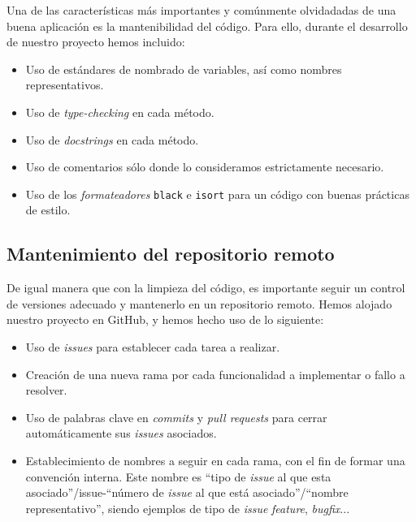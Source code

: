 \documentclass[11pt,a4paper]{article}
\begin{document}
Una de las características más importantes y comúnmente olvidadadas de una buena aplicación es la mantenibilidad del código. Para ello, durante el desarrollo de nuestro proyecto hemos incluido:

\begin{itemize}
    \item Uso de estándares de nombrado de variables, así como nombres representativos.
    \item Uso de \textit{type-checking} en cada método.
    \item Uso de \textit{docstrings} en cada método.
    \item Uso de comentarios sólo donde lo consideramos estrictamente necesario.
    \item Uso de los \textit{formateadores} \lstinline!black! e \lstinline!isort! para un código con buenas prácticas de estilo.
\end{itemize}

\subsection{Mantenimiento del repositorio remoto}

De igual manera que con la limpieza del código, es importante seguir un control de versiones adecuado y mantenerlo en un repositorio remoto. Hemos alojado nuestro proyecto en GitHub, y hemos hecho uso de lo siguiente:

\begin{itemize}
    \item Uso de \textit{issues} para establecer cada tarea a realizar.
    \item Creación de una nueva rama por cada funcionalidad a implementar o fallo a resolver.
    \item Uso de palabras clave en \textit{commits} y \textit{pull requests} para cerrar automáticamente sus \textit{issues} asociados.
    \item Establecimiento de nombres a seguir en cada rama, con el fin de formar una convención interna. Este nombre es ``tipo de \textit{issue} al que esta asociado''/issue-``número de \textit{issue} al que está asociado''/``nombre representativo'', siendo ejemplos de tipo de \textit{issue} \textit{feature}, \textit{bugfix}...
\end{itemize}
\end{document}
